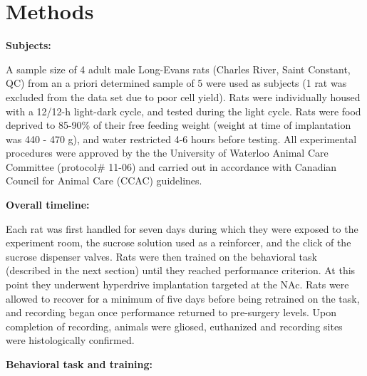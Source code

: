\documentclass[11pt]{article}
\providecommand{\DIFadd}[1]{{\protect\color{red} \sf #1}} %
\providecommand{\DIFdel}[1]{} %
\providecommand{\DIFaddbegin}{} %
\providecommand{\DIFaddend}{} %
\providecommand{\DIFdelbegin}{} %
\providecommand{\DIFdelend}{} %
\newcommand{\DIFscaledelfig}{0.5}
\newlength{\DIFdelgraphicswidth} %
\newlength{\DIFdelgraphicsheight} %
\newcommand{\DIFaddincludegraphics}[2][]{{\color{red}\fbox{\DIFOincludegraphics[#1]{#2}}}} %
\newcommand{\DIFdelincludegraphics}[2][]{%
\sbox{\DIFdelgraphicsbox}{\DIFOincludegraphics[#1]{#2}}%
\settoboxwidth{\DIFdelgraphicswidth}{\DIFdelgraphicsbox} %
\settoboxtotalheight{\DIFdelgraphicsheight}{\DIFdelgraphicsbox} %
\scalebox{\DIFscaledelfig}{%
\parbox[b]{\DIFdelgraphicswidth}{\usebox{\DIFdelgraphicsbox}\\[-\baselineskip] \rule{\DIFdelgraphicswidth}{0em}}\llap{\resizebox{\DIFdelgraphicswidth}{\DIFdelgraphicsheight}{%
\setlength{\unitlength}{\DIFdelgraphicswidth}%
\begin{picture}(1,1)%
\thicklines\linethickness{2pt} %
{\color[rgb]{1,0,0}\put(0,0){\framebox(1,1){}}}%
{\color[rgb]{1,0,0}\put(0,0){\line( 1,1){1}}}%
{\color[rgb]{1,0,0}\put(0,1){\line(1,-1){1}}}%
\end{picture}%
}\hspace*{3pt}}} %
} %
\DeclareRobustCommand{\DIFaddbegin}{\DIFOaddbegin \let\includegraphics\DIFaddincludegraphics} %
\DeclareRobustCommand{\DIFaddend}{\DIFOaddend \let\includegraphics\DIFOincludegraphics} %
\DeclareRobustCommand{\DIFdelbegin}{\DIFOdelbegin \let\includegraphics\DIFdelincludegraphics} %
\DeclareRobustCommand{\DIFdelend}{\DIFOaddend \let\includegraphics\DIFOincludegraphics} %
\begin{document}
\section*{Methods}

{\bf Subjects:}

A sample size of 4 adult male Long-Evans rats (Charles River, Saint
Constant, QC) from an \DIFdelbegin \DIFdel{apriori }\DIFdelend \DIFaddbegin \DIFadd{a priori }\DIFaddend determined sample of 5 were used as
subjects (1 rat was excluded from the data set due to poor cell
yield). Rats were individually housed with a 12/12-h light-dark cycle,
and tested during the light cycle. Rats were food deprived to 85-90\%
of their free feeding weight (weight at time of implantation was 440 -
470 g), and water restricted 4-6 hours before testing. All
experimental procedures were approved by the the University of
Waterloo Animal Care Committee (protocol\# 11-06) and carried out in
accordance with Canadian Council for Animal Care (CCAC) guidelines.

{\bf Overall timeline:}

Each rat was first handled for seven days during which they were
exposed to the experiment room, the sucrose solution used as a
reinforcer, and the click of the sucrose dispenser valves. Rats were
then trained on the behavioral task (described in the next section)
until they reached performance criterion. At this point they
underwent hyperdrive implantation targeted at the NAc. Rats were
allowed to recover for a minimum of five days before being retrained
on the task, and recording began once performance returned to
pre-surgery levels. Upon completion of recording, animals were gliosed,
euthanized and recording sites were histologically confirmed.

{\bf Behavioral task and training:}
\end{document}
